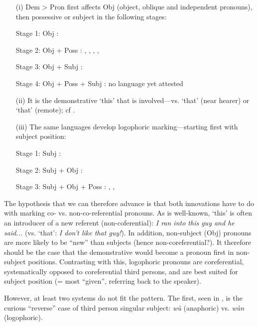 \documentclass[output=paper]{langsci/langscibook}
\begin{document}
\begin{enumerate}
\item[(i)]  Dem > Pron first affects Obj (object, oblique and independent pronouns), then possessive or subject in the following stages:

  Stage 1:  Obj  :  

  Stage 2:  Obj + Poss  :  , , , , 

  Stage 3:  Obj + Subj  :  

  Stage 4:  Obj + Poss + Subj  :  no  language yet attested

\item[(ii)]  It is the demonstrative ‘this’ that is involved—vs. ‘that’ (near hearer) or ‘that’ (remote); cf .

\item[(iii)]  The same languages develop logophoric marking—starting first with subject position:

  Stage 1:  Subj  :  

  Stage 2:  Subj + Obj  :  

  Stage 3:  Subj + Obj + Poss  :  , , 
\end{enumerate}

The hypothesis that we can therefore advance is that both innovations have to do with marking co- vs. non-co-referential pronouns. As is well-known, ‘this’ is often an introducer of a new referent (non-coferential): \textit{I ran into this guy and he said...} (vs. ‘that’: \textit{I don’t like that guy!}). In addition, non-subject (Obj) pronouns are more likely to be “new” than subjects (hence non-coreferential?). It therefore should be the case that the demonstrative would become a pronoun first in non-subject positions. Contrasting with this, logophoric pronouns are coreferential, systematically opposed to coreferential third persons, and are best suited for subject position (= most “given”, referring back to the speaker).

However, at least two systems do not fit the pattern. The first, seen in , is the curious “reverse” case of  third person singular subject: \textit{wù} (anaphoric) vs. \textit{wùn} (logophoric).
\end{document}
